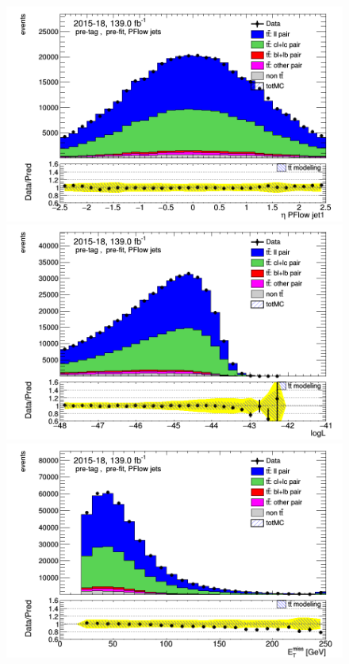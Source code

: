 \documentclass[letterpaper,12pt]{article}
\begin{document}
\begin{figure}
\begin{minipage}[b]{.45\textwidth}
\end{minipage}\hfill
\begin{minipage}[b]{.45\textwidth}
\centering
\includegraphics[width=1\textwidth]{Oct_distributions/pretagNoRwDL1rwithhighpTPFlow_scaledall/DataMC_J1_eta.png}
\end{minipage}\hfill
\begin{minipage}[b]{.45\textwidth}
\centering
\includegraphics[width=1\textwidth]{Oct_distributions/pretagNoRwDL1rwithhighpTPFlow_scaledall/DataMC_LLR.png}
\end{minipage}\hfill
\begin{minipage}[b]{.45\textwidth}
\centering
\includegraphics[width=1\textwidth]{Oct_distributions/pretagNoRwDL1rwithhighpTPFlow_scaledall/DataMC_MET.png}

\end{minipage}
\end{figure}
\end{document}
